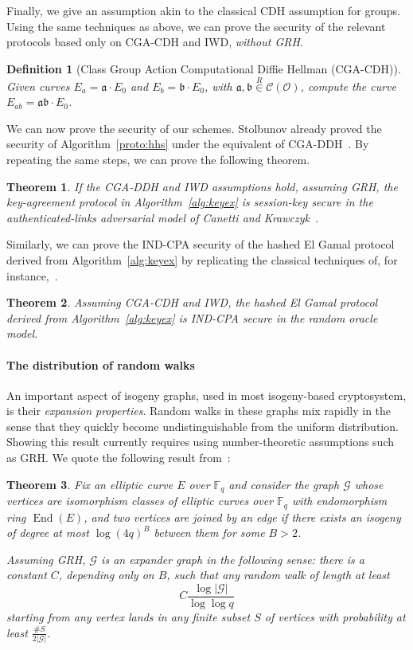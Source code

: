 \documentclass{article}
\newcommand{\F}{\mathbb{F}}
\newcommand{\Cl}{\mathcal{C}}
\newcommand{\Graph}{\mathcal{G}}
\renewcommand{\O}{\mathcal{O}}
\renewcommand{\frak}{\mathfrak}
\newcommand{\rand}[1]{\overset{#1}{∈}}
\newcommand{\uni}{\rand{R}}
\newtheorem{theorem}{Theorem}[section]
\newtheorem{definition}{Definition}[section]
\theoremstyle{definition}
\DeclareMathOperator{\End}{End}
\begin{document}
Finally, we give an assumption akin to the classical CDH assumption
for groups. Using the same techniques as above, we can prove the
security of the relevant protocols based only on CGA-CDH and IWD,
\emph{without GRH}.

\begin{definition}[Class Group Action Computational Diffie Hellman (CGA-CDH)]
  Given curves $E_a=\frak a·E_0$ and $E_b=\frak b·E_0$, with
  $\frak a,\frak b\uni\Cl(\O)$, compute the curve
  $E_{ab}=\frak{ab}·E_0$.
\end{definition}

We can now prove the security of our schemes. Stolbunov already proved
the security of Algorithm~\ref{proto:hhs} under the equivalent of
CGA-DDH~\cite{Stol}. By repeating the same steps, we can prove the
following theorem.

\begin{theorem}
  If the CGA-DDH and IWD assumptions hold, assuming GRH, the
  key-agreement protocol in Algorithm~\ref{alg:keyex} is session-key
  secure in the authenticated-links adversarial model of Canetti and
  Krawczyk~\cite{canetti}.
\end{theorem}

Similarly, we can prove the IND-CPA security of the hashed El Gamal
protocol derived from Algorithm~\ref{alg:keyex} by replicating the
classical techniques of, for
instance,~\cite[20.4.11]{galbraith2012mathematics}.

\begin{theorem}
  Assuming CGA-CDH and IWD, the hashed El Gamal protocol derived from
  Algorithm~\ref{alg:keyex} is IND-CPA secure in the random oracle
  model.
\end{theorem}


\paragraph{The distribution of random walks}
An important aspect of isogeny graphs, used in most
isogeny-based cryptosystem, is their \emph{expansion properties}.
Random walks in these graphs mix rapidly in the sense that they
quickly become undistinguishable from the uniform distribution.
Showing this result currently requires using number-theoretic
assumptions such as GRH.
We quote the following result from~\cite{jao+miller+venkatesan09}:

\begin{theorem}
Fix an elliptic curve $E$ over $\F_q$ and consider the graph $\Graph$
whose vertices are isomorphism classes of elliptic curves over $\F_q$
with endomorphism ring $\End(E)$, and two vertices are joined by an edge
if there exists an isogeny of degree at most $\log(4q)^B$ between them
for some $B>2$.

Assuming GRH, $\Graph$ is an expander graph in the following sense:
there is a constant $C$, depending only on $B$, such that any random
walk of length at least
\[
	C \frac{\log |\Graph|}{\log\log q}
\]
starting from any vertex lands in any finite subset $S$ of vertices
with probability at least $\frac{\#S}{2|\Graph|}$.
\end{theorem}
\end{document}
